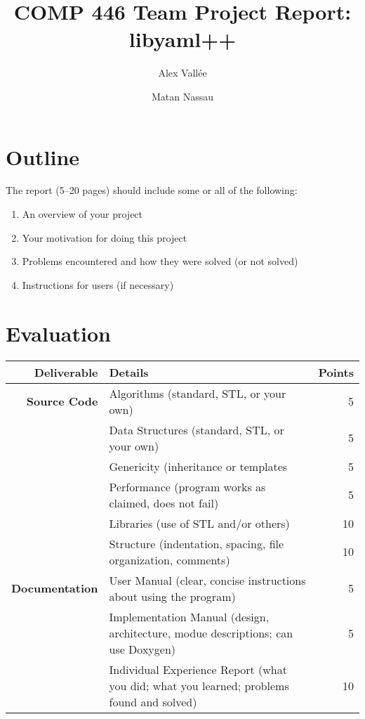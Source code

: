 \documentclass{article}
\author{Alex Vall\'ee \and Matan Nassau}
\title{COMP 446 Team Project Report:  libyaml++}
\begin{document}
\maketitle

\section{Outline}
The report (5--20 pages) should include some or all of the following:

\begin{enumerate}
  \item An overview of your project
  \item Your motivation for doing this project
  \item Problems encountered and how they were solved (or not solved)
  \item Instructions for users (if necessary)
\end{enumerate}

\section{Evaluation}
\vspace{2em}

\begin{tabular}{rp{40ex}r}
  \hline
  \textbf{Deliverable} & \textbf{Details} & \textbf{Points} \\
  \hline
  \textbf{Source Code} & Algorithms (standard, STL, or your own) & 5 \\
  & Data Structures (standard, STL, or your own) & 5 \\
  & Genericity (inheritance or templates & 5 \\
  & Performance (program works as claimed, does not fail) & 5 \\
  & Libraries (use of STL and/or others) & 10 \\
  & Structure (indentation, spacing, file organization, comments) & 10 \\
  \textbf{Documentation} & User Manual (clear, concise instructions about using the program) & 5 \\
  & Implementation Manual (design, architecture, modue descriptions; can use Doxygen) & 5 \\
  & Individual Experience Report (what you did; what you learned; problems found and solved) & 10 \\
  \hline
\end{tabular}
\end{document}

